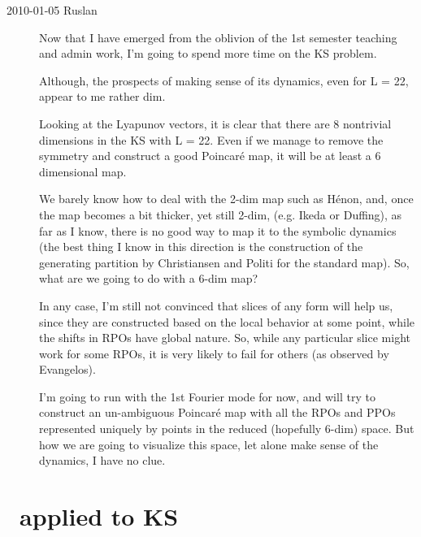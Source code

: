 \begin{description}
\item[2010-01-05 Ruslan] Now that I have emerged from the
oblivion of the 1st semester teaching and admin work, I'm
going to spend more time on the KS problem.

Although, the prospects of making sense of its dynamics, even
for L = 22, appear to me rather dim.

Looking at the Lyapunov vectors, it is clear that there are 8
nontrivial dimensions in the KS with L = 22.  Even if we
manage to remove the symmetry and construct a good Poincar\'e
map, it will be at least a 6 dimensional map.

We barely know how to deal with the 2-dim map such as H\'enon,
and, once the map becomes a bit thicker, yet still 2-dim,
(e.g. Ikeda or Duffing), as far as I know, there is no good
way to map it to the symbolic dynamics (the best thing I know
in this direction is the construction of the generating
partition by Christiansen and Politi for the standard map).
So, what are we going to do with a 6-dim map?

In any case, I'm still not convinced that slices of any form
will help us, since they are constructed based on the local
behavior at some point, while the shifts in RPOs have global
nature.  So, while any particular slice might work for some
RPOs, it is very likely to fail for others (as observed by
Evangelos).

I'm going to run with the 1st Fourier mode for now, and will
try to construct an un-ambiguous Poincar\'e map with all the
RPOs and PPOs represented uniquely by points in the reduced
(hopefully 6-dim) space. But how we are going to visualize
this space, let alone make sense of the dynamics, I have no
clue.

\end{description}

\section{\Mslices\ applied to KS}
\renewcommand{\LieElrep}{\ensuremath{g}} %

